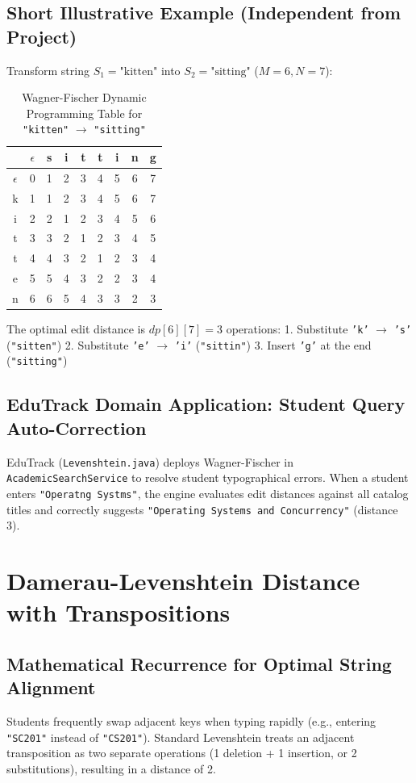 \subsection{Short Illustrative Example (Independent from Project)}
Transform string $S_1 = \text{"kitten"}$ into $S_2 = \text{"sitting"}$ ($M = 6, N = 7$):
\begin{table}[H]
\centering
\begin{tabular}{c|cccccccc}
\toprule
 & $\epsilon$ & s & i & t & t & i & n & g \\
\midrule
$\epsilon$ & 0 & 1 & 2 & 3 & 4 & 5 & 6 & 7 \\
k & 1 & 1 & 2 & 3 & 4 & 5 & 6 & 7 \\
i & 2 & 2 & 1 & 2 & 3 & 4 & 5 & 6 \\
t & 3 & 3 & 2 & 1 & 2 & 3 & 4 & 5 \\
t & 4 & 4 & 3 & 2 & 1 & 2 & 3 & 4 \\
e & 5 & 5 & 4 & 3 & 2 & 2 & 3 & 4 \\
n & 6 & 6 & 5 & 4 & 3 & 3 & 2 & 3 \\
\bottomrule
\end{tabular}
\caption{Wagner-Fischer Dynamic Programming Table for \texttt{"kitten"} $\to$ \texttt{"sitting"}}
\label{tab:levenshtein_table}
\end{table}
The optimal edit distance is $dp[6][7] = 3$ operations:
1. Substitute \texttt{'k'} $\to$ \texttt{'s'} (\texttt{"sitten"})
2. Substitute \texttt{'e'} $\to$ \texttt{'i'} (\texttt{"sittin"})
3. Insert \texttt{'g'} at the end (\texttt{"sitting"})

\subsection{EduTrack Domain Application: Student Query Auto-Correction}
EduTrack (\texttt{Levenshtein.java}) deploys Wagner-Fischer in \texttt{AcademicSearchService} to resolve student typographical errors. When a student enters \texttt{"Operatng Systms"}, the engine evaluates edit distances against all catalog titles and correctly suggests \texttt{"Operating Systems and Concurrency"} (distance 3).

\section{Damerau-Levenshtein Distance with Transpositions}
\subsection{Mathematical Recurrence for Optimal String Alignment}
Students frequently swap adjacent keys when typing rapidly (e.g., entering \texttt{"SC201"} instead of \texttt{"CS201"}). Standard Levenshtein treats an adjacent transposition as two separate operations (1 deletion + 1 insertion, or 2 substitutions), resulting in a distance of 2. 

